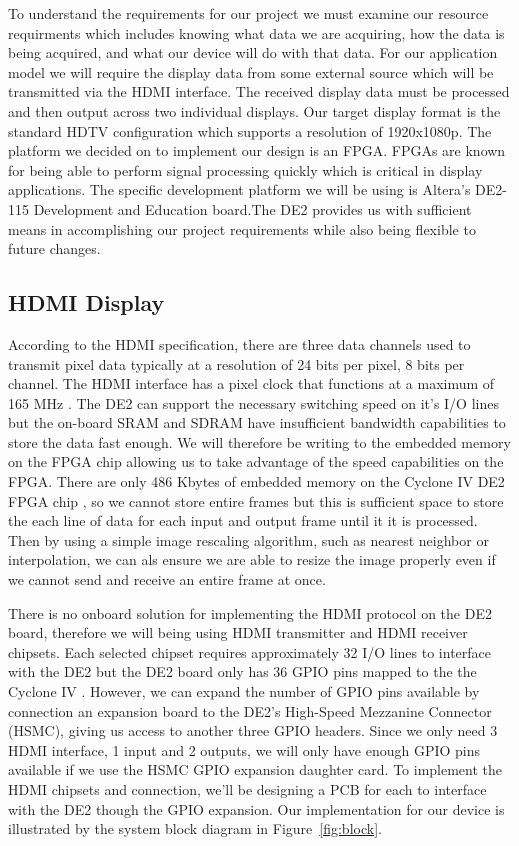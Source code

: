 \documentclass[12pt]{article}
\begin{document}
To understand the requirements for our project we must examine our resource requirments which includes knowing what data we are acquiring, how the data is being acquired, and what our device will do with that data. For our application model we will require the display data from some external source which will be transmitted via the HDMI interface. The received display data must be processed and then output across two individual displays. Our target display format is the standard HDTV configuration which supports a resolution of 1920x1080p. The platform we decided on to implement our design is an FPGA. FPGAs are known for being able to perform signal processing quickly which is critical in display applications. The specific development platform we will be using is Altera's DE2-115 Development and Education board.The DE2 provides us with sufficient means in accomplishing our project requirements while also being flexible to future changes.

\subsection{HDMI Display}

According to the HDMI specification, there are three data channels used to transmit pixel data typically at a resolution of 24 bits per pixel, 8 bits per channel. The HDMI interface has a pixel clock that functions at a maximum of 165 MHz \cite{Ref_HDMI_Spec}. The DE2 can support the necessary switching speed on it's I/O lines but the on-board SRAM and SDRAM have insufficient bandwidth capabilities to store the data fast enough. We will therefore be writing to the embedded memory on the FPGA chip allowing us to take advantage of the speed capabilities on the FPGA. There are only 486 Kbytes of embedded memory on the Cyclone IV DE2 FPGA chip \cite{Ref_Memory_Block}, so we cannot store entire frames but this is sufficient space to store the each line of data for each input and output frame until it it is processed. Then by using a simple image rescaling algorithm, such as nearest neighbor or interpolation, we can als ensure we are able to resize the image properly even if we cannot send and receive an entire frame at once.

There is no onboard solution for implementing the HDMI protocol on the DE2 board, therefore we will being using HDMI transmitter and HDMI receiver chipsets. Each selected chipset requires approximately 32 I/O lines \cite{Ref_HDMI_Rx} to interface with the DE2 but the DE2 board only has 36 GPIO pins mapped to the the Cyclone IV \cite{Ref_DE2}. However, we can expand the number of GPIO pins available by connection an expansion board to the DE2's High-Speed Mezzanine Connector (HSMC), giving us access to another three GPIO headers. Since we only need 3 HDMI interface, 1 input and 2 outputs, we will only have enough GPIO pins available if we use the HSMC GPIO expansion daughter card. To implement the HDMI chipsets and connection, we'll be designing a PCB for each to interface with the DE2 though the GPIO expansion. Our implementation for our device is illustrated by the system block diagram in Figure~\ref{fig:block}.
\end{document}

